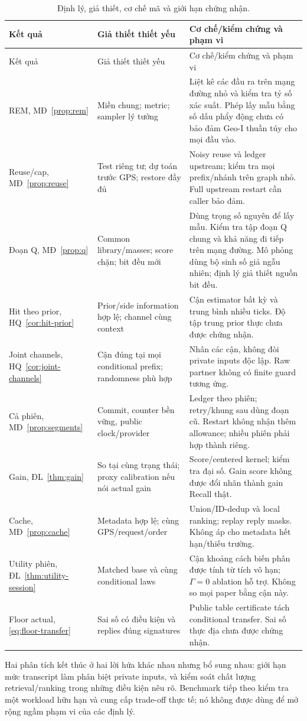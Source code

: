 \begingroup\small{}\begin{longtable}{@{}P{3.0cm}P{4.5cm}P{7.9cm}@{}}
\caption{Định lý, giả thiết, cơ chế mã và giới hạn chứng nhận.}\label{tab:proof-map}\\
\toprule Kết quả & Giả thiết thiết yếu & Cơ chế/kiểm chứng và phạm vi\\\midrule\endfirsthead
\toprule Kết quả & Giả thiết thiết yếu & Cơ chế/kiểm chứng và phạm vi\\\midrule\endhead
\bottomrule\endfoot
REM, MĐ~\ref{prop:rem} & Miền chung; metric; sampler lý tưởng &
Liệt kê các đầu ra trên mạng đường nhỏ và kiểm tra tỷ số xác suất. Phép lấy mẫu bằng số dấu phẩy động chưa có bảo đảm Geo-I thuần túy cho mọi đầu vào.\\
Reuse/cap, MĐ~\ref{prop:reuse} & Test riêng tư; dự toán trước GPS; restore đầy đủ &
Noisy reuse và ledger upstream; kiểm tra mọi prefix/nhánh trên graph nhỏ. Full upstream restart cần caller bảo đảm.\\
Đoạn Q, MĐ~\ref{prop:q} & Common library/masses; score chặn; bit đều mới &
Dùng trọng số nguyên để lấy mẫu. Kiểm tra tập đoạn Q chung và khả năng đi tiếp trên mạng đường. Mô phỏng dùng bộ sinh số giả ngẫu nhiên; định lý giả thiết nguồn bit đều.\\
Hit theo prior, HQ~\ref{cor:hit-prior} & Prior/side information hợp lệ; channel cùng context &
Cận estimator bất kỳ và trung bình nhiều ticks. Độ tập trung prior thực chưa được chứng nhận.\\
Joint channels, HQ~\ref{cor:joint-channels} & Cận đúng tại mọi conditional prefix; randomness phù hợp &
Nhân các cận, không đòi private inputs độc lập. Raw partner không có finite guard tương ứng.\\
Cả phiên, MĐ~\ref{prop:segments} & Commit, counter bền vững, public clock/provider &
Ledger theo phiên; retry/khung sau dùng đoạn cũ. Restart không nhận thêm allowance; nhiều phiên phải hợp thành riêng.\\
Gain, ĐL~\ref{thm:gain} & So tại cùng trạng thái; proxy calibration nếu nói actual gain &
Score/centered kernel; kiểm tra đại số. Gain score không được đổi nhãn thành gain Recall thật.\\
Cache, MĐ~\ref{prop:cache} & Metadata hợp lệ; cùng GPS/request/order &
Union/ID-dedup và local ranking; replay reply masks. Không áp cho metadata hết hạn/thiếu trường.\\
Utility phiên, ĐL~\ref{thm:utility-session} & Matched base và cùng conditional laws &
Cận khoảng cách biến phân được tính từ tích vô hạn; $\Gamma=0$ ablation hỗ trợ. Không so mọi paper bằng cận này.\\
Floor actual, \eqref{eq:floor-transfer} & Sai số có điều kiện và replies đúng signatures &
Public table certificate tách conditional transfer. Sai số thực địa chưa được chứng nhận.\\
\end{longtable}\endgroup

Hai phân tích kết thúc ở hai lời hứa khác nhau nhưng bổ sung nhau: giới hạn mức transcript làm
phân biệt private inputs, và kiểm soát chất lượng retrieval/ranking trong những điều kiện nêu rõ.
Benchmark tiếp theo kiểm tra một workload hữu hạn và cung cấp trade-off thực tế; nó không được
dùng để mở rộng ngầm phạm vi của các định lý.
